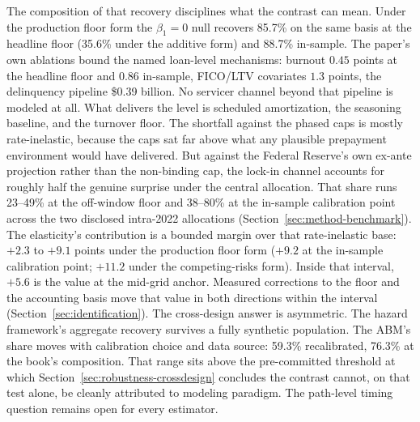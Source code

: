 \documentclass[12pt]{article}
\begin{document}
The composition of that recovery disciplines what the contrast can mean. Under the production floor form the $\beta_1 = 0$ null recovers 85.7\% on the same basis at the headline floor (35.6\% under the additive form) and 88.7\% in-sample. The paper's own ablations bound the named loan-level mechanisms: burnout $0.45$ points at the headline floor and $0.86$ in-sample, FICO/LTV covariates $1.3$ points, the delinquency pipeline \$0.39 billion. No servicer channel beyond that pipeline is modeled at all. What delivers the level is scheduled amortization, the seasoning baseline, and the turnover floor. The shortfall against the phased caps is mostly rate-inelastic, because the caps sat far above what any plausible prepayment environment would have delivered. But against the Federal Reserve's own ex-ante projection rather than the non-binding cap, the lock-in channel accounts for roughly half the genuine surprise under the central allocation. That share runs 23--49\% at the off-window floor and 38--80\% at the in-sample calibration point across the two disclosed intra-2022 allocations (Section~\ref{sec:method-benchmark}). The elasticity's contribution is a bounded margin over that rate-inelastic base: $+2.3$ to $+9.1$ points under the production floor form ($+9.2$ at the in-sample calibration point; $+11.2$ under the competing-risks form). Inside that interval, $+5.6$ is the value at the mid-grid anchor. Measured corrections to the floor and the accounting basis move that value in both directions within the interval (Section~\ref{sec:identification}). The cross-design answer is asymmetric. The hazard framework's aggregate recovery survives a fully synthetic population. The ABM's share moves with calibration choice and data source: 59.3\% recalibrated, 76.3\% at the book's composition. That range sits above the pre-committed threshold at which Section~\ref{sec:robustness-crossdesign} concludes the contrast cannot, on that test alone, be cleanly attributed to modeling paradigm. The path-level timing question remains open for every estimator.
\end{document}
